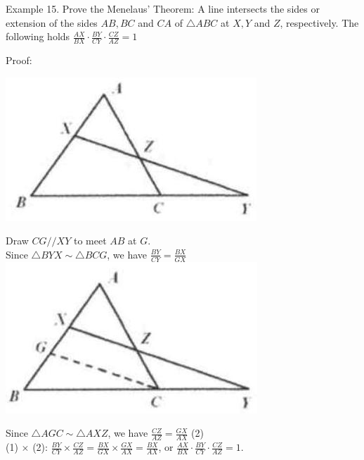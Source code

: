 \documentclass[10pt]{article}
\begin{document}
Example 15. Prove the Menelaus' Theorem: A line intersects the sides or extension of the sides \(A B, B C\) and \(C A\) of \(\triangle A B C\) at \(X, Y\) and \(Z\), respectively. The following holds \(\frac{A X}{B X} \cdot \frac{B Y}{C Y} \cdot \frac{C Z}{A Z}=1\)

Proof:
\begin{center}
\includegraphics[max width=\textwidth]{2025_04_17_97bc1f7e44d93c271a88g-117(1)}
\end{center}

Draw \(C G / / X Y\) to meet \(A B\) at \(G\).\\
Since \(\triangle B Y X \sim \triangle B C G\), we have \(\frac{B Y}{C Y}=\frac{B X}{G X}\)\\
\includegraphics[max width=\textwidth, center]{2025_04_17_97bc1f7e44d93c271a88g-117(2)}

Since \(\triangle A G C \sim \triangle A X Z\), we have \(\frac{C Z}{A Z}=\frac{G X}{A X}\) (2)\\
(1) \(\times\) (2): \(\frac{B Y}{C Y} \times \frac{C Z}{A Z}=\frac{B X}{G X} \times \frac{G X}{A X}=\frac{B X}{A X}\), or \(\frac{A X}{B X} \cdot \frac{B Y}{C Y} \cdot \frac{C Z}{A Z}=1\).
\end{document}
